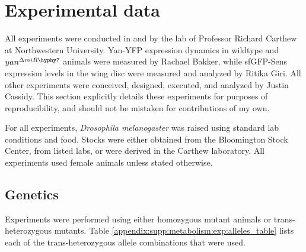 \graphicspath{ {./figures/metabolism/} }


\section{Experimental data}
\label{appendix:supp:metabolism:experiments}

All experiments were conducted in and by the lab of Professor Richard Carthew at Northwestern University. Yan-YFP expression dynamics in wildtype and $yan^{\Delta miR\hyphy 7}$ animals were measured by Rachael Bakker, while sfGFP-Sens expression levels in the wing disc were measured and analyzed by Ritika Giri. All other experiments were conceived, designed, executed, and analyzed by Justin Cassidy. This section explicitly details these experiments for purposes of reproducibility, and should not be mistaken for contributions of my own.

For all experiments, \textit{Drosophila melanogaster} was raised using standard lab conditions and food. Stocks were either obtained from the Bloomington Stock Center, from listed labs, or were derived in the Carthew laboratory. All experiments used female animals unless stated otherwise.

\subsection{Genetics}
\label{appendix:supp:metabolism:exp:genetics}

Experiments were performed using either homozygous mutant animals or trans-heterozygous mutants. Table \ref{appendix:supp:metabolism:exp:alleles_table} lists each of the trans-heterozygous allele combinations that were used.

